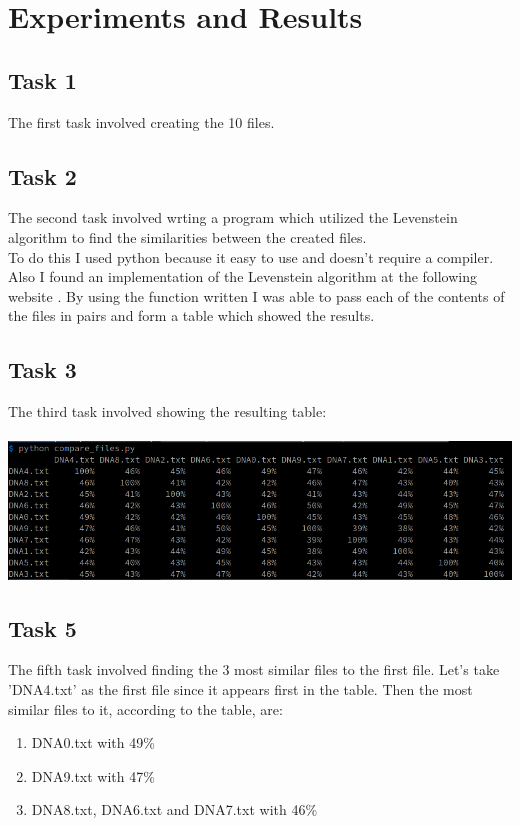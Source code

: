\documentclass[]{article}
\newcommand\tab[1][1cm]{\hspace*{#1}}
\begin{document}
\section{Experiments and Results}

\subsection{Task 1}
\tab The first task involved creating the 10 files.

\subsection{Task 2}
\tab The second task involved wrting a program which utilized the Levenstein
algorithm to find the similarities between the created files.\\
\tab To do this I used python because it easy to use and doesn't require a
compiler. Also I found an implementation of the Levenstein algorithm at the
following website \cite{LevensteinCode}. By using the function written I was able to pass each 
of the contents of the files in pairs and form a table which showed the results.

\subsection{Task 3}
\tab The third task involved showing the resulting table:\\ \\
\includegraphics[scale=0.7]{res/similarities.png}

\subsection{Task 5}
\tab The fifth task involved finding the 3 most similar files to the first file.
Let's take 'DNA4.txt' as the first file since it appears first in the table.
Then the most similar files to it, according to the table, are:
\begin{enumerate}
	\item DNA0.txt with 49\%
	\item DNA9.txt with 47\%
	\item DNA8.txt, DNA6.txt and DNA7.txt with 46\%
\end{enumerate}

{}

\end{document}

